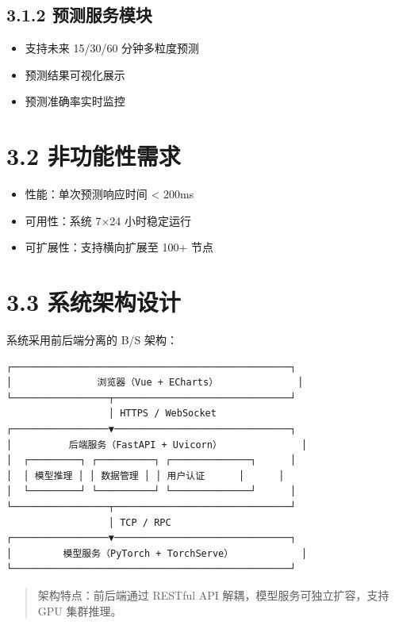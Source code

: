 \documentclass{harryopo-report}
\begin{document}
\subsection*{3.1.2 预测服务模块}

\begin{itemize}
  \item 支持未来 15/30/60 分钟多粒度预测
  \item 预测结果可视化展示
  \item 预测准确率实时监控
\end{itemize}

\section*{3.2 非功能性需求}

\begin{itemize}
  \item {\fzht 性能}：单次预测响应时间 < 200ms
  \item {\fzht 可用性}：系统 7×24 小时稳定运行
  \item {\fzht 可扩展性}：支持横向扩展至 100+ 节点
\end{itemize}

\section*{3.3 系统架构设计}

系统采用前后端分离的 B/S 架构：

\begin{lstlisting}[style=plainstyle,caption={}]
┌─────────────────────────────────────────────────┐
│               浏览器（Vue + ECharts）              │
└─────────────────┬───────────────────────────────┘
                  │ HTTPS / WebSocket
┌─────────────────▼───────────────────────────────┐
│          后端服务（FastAPI + Uvicorn）              │
│  ┌─────────┐ ┌──────────┐ ┌──────────────┐      │
│  │ 模型推理 │ │ 数据管理 │ │ 用户认证      │      │
│  └─────────┘ └──────────┘ └──────────────┘      │
└─────────────────┬───────────────────────────────┘
                  │ TCP / RPC
┌─────────────────▼───────────────────────────────┐
│         模型服务（PyTorch + TorchServe）            │
└─────────────────────────────────────────────────┘
\end{lstlisting}

\begin{quote}
{\fzht 架构特点}：前后端通过 RESTful API 解耦，模型服务可独立扩容，支持 GPU 集群推理。
\end{quote}
\end{document}
